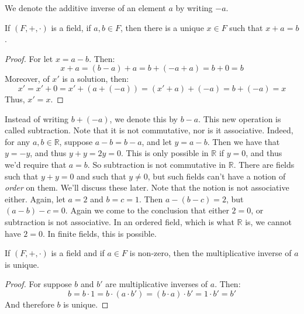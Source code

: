             We denote the additive inverse of an element $a$ by
            writing $\minus{a}$.
            \begin{theorem}
                If $(F,+,\cdot)$ is a field, if $a,b\in{F}$, then
                there is a unique $x\in{F}$ such that
                $x+a=b$.
            \end{theorem}
            \begin{proof}
                For let $x=a-b$. Then:
                \begin{equation}
                    x+a=(b-a)+a
                    =b+(-a+a)
                    =b+0
                    =b
                \end{equation}
                Moreover, of $x'$ is a solution, then:
                \begin{equation}
                    x'=x'+0=x'+(a+(\minus{a}))=
                    (x'+a)+(\minus{a})=b+(\minus{a})=x
                \end{equation}
                Thus, $x'=x$.
            \end{proof}
            Instead of writing $b+(\minus{a})$, we
            denote this by $b-a$. This new operation is called
            subtraction. Note that it is not commutative, nor
            is it associative. Indeed, for any $a,b\in\mathbb{R}$,
            suppose $a-b=b-a$, and let $y=a-b$. Then we have that
            $y=\minus{y}$, and thus $y+y=2y=0$. This is only possible
            in $\mathbb{R}$ if $y=0$, and thus we'd require that
            $a=b$. So subtraction is not commutative in $\mathbb{R}$.
            There are fields such that $y+y=0$ and such that
            $y\ne{0}$, but such fields can't have a notion of
            \textit{order} on them. We'll discuss these later.
            Note that the notion is not associative either. Again,
            let $a=2$ and $b=c=1$. Then $a-(b-c)=2$, but
            $(a-b)-c=0$. Again we come to the conclusion that either
            $2=0$, or subtraction is not associative. In an ordered
            field, which is what $\mathbb{R}$ is, we cannot have
            $2=0$. In finite fields, this is possible.
            \begin{theorem}
                If $(F,+,\cdot)$ is a field and if $a\in{F}$
                is non-zero, then the multiplicative inverse
                of $a$ is unique.
            \end{theorem}
            \begin{proof}
                For suppose $b$ and $b'$ are multiplicative inverses
                of $a$. Then:
                \begin{equation}
                    b=b\cdot{1}=b\cdot(a\cdot{b}')=
                    (b\cdot{a})\cdot{b}'=1\cdot{b}'=b'
                \end{equation}
                And therefore $b$ is unique.
            \end{proof}
